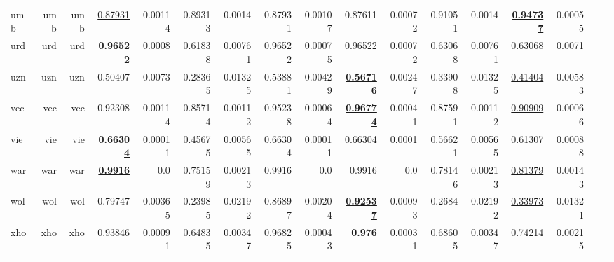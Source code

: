 \documentclass[11pt]{article}
\begin{document}
\begin{table*}[h]
{\begin{tabular}{lrrrrrrrrrrrrrrrr}
umb         & umb         & umb         & \underline{0.87931}         & 0.00114         & 0.89313         & 0.0014         & 0.87931         & 0.00107         & 0.87611         & 0.00072         & 0.91051         & 0.0014         & \textbf{\underline{0.94737}}         & 0.00055         \\
urd         & urd         & urd         & \textbf{\underline{0.96522}}         & 0.0008         & 0.61838         & 0.00761         & 0.96522         & 0.00075         & 0.96522         & 0.00072         & \underline{0.63068}         & 0.00761         & 0.63068         & 0.0071         \\
uzn         & uzn         & uzn         & 0.50407         & 0.0073         & 0.28365         & 0.01325         & 0.53881         & 0.00429         & \textbf{\underline{0.56716}}         & 0.00247         & 0.33908         & 0.01325         & \underline{0.41404}         & 0.00583         \\
vec         & vec         & vec         & 0.92308         & 0.00114         & 0.85714         & 0.00112         & 0.95238         & 0.00064         & \textbf{\underline{0.96774}}         & 0.00041         & 0.87591         & 0.00112         & \underline{0.90909}         & 0.00066         \\
vie         & vie         & vie         & \textbf{\underline{0.66304}}         & 0.00011         & 0.45675         & 0.00565         & 0.66304         & 0.00011         & 0.66304         & 0.0001         & 0.56621         & 0.00565         & \underline{0.61307}         & 0.00088         \\
war         & war         & war         & \textbf{\underline{0.9916}}         & 0.0         & 0.75159         & 0.00213         & 0.9916         & 0.0         & 0.9916         & 0.0         & 0.78146         & 0.00213         & \underline{0.81379}         & 0.00143         \\
wol         & wol         & wol         & 0.79747         & 0.00365         & 0.23985         & 0.02192         & 0.86897         & 0.00204         & \textbf{\underline{0.92537}}         & 0.00093         & 0.2684         & 0.02192         & \underline{0.33973}         & 0.01321         \\
xho         & xho         & xho         & 0.93846         & 0.00091         & 0.64835         & 0.00347         & 0.96825         & 0.00043         & \textbf{\underline{0.976}}         & 0.00031         & 0.68605         & 0.00347         & \underline{0.74214}         & 0.00215         \\

\end{tabular}}
\end{table*}
\end{document}
